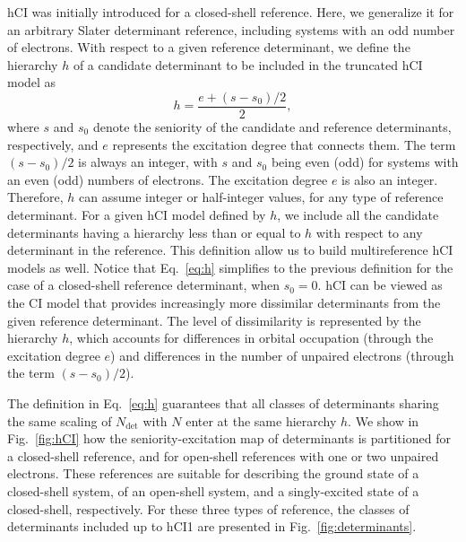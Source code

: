\documentclass[aip,jcp,reprint,noshowkeys,superscriptaddress]{revtex4-1}
\newcommand{\Ndet}{N_\text{det}}
\begin{document}
hCI was initially introduced for a closed-shell reference. \cite{Kossoski_2022}
Here, we generalize it for an arbitrary Slater determinant reference, including systems with an odd number of electrons.
With respect to a given reference determinant, we define the hierarchy $h$ of a candidate determinant to be included in the truncated hCI model as
\begin{equation}
  \label{eq:h}
  h = \frac{e+ (s-s_0)/2}{2},
\end{equation}
where $s$ and $s_0$ denote the seniority of the candidate and reference determinants, respectively, and $e$ represents the excitation degree that connects them.
The term $(s-s_0)/2$ is always an integer, with $s$ and $s_0$ being even (odd) for systems with an even (odd) numbers of electrons. The excitation degree $e$ is also an integer.
Therefore, $h$ can assume integer or half-integer values, for any type of reference determinant.
For a given hCI model defined by $h$, we include all the candidate determinants having a hierarchy less than or equal to $h$ with respect to any determinant in the reference.
This definition allow us to build multireference hCI models as well.
Notice that Eq.~\eqref{eq:h} simplifies to the previous definition \cite{Kossoski_2022} for the case of a closed-shell reference determinant, when $s_0 = 0$.
hCI can be viewed as the CI model that provides increasingly more dissimilar determinants from the given reference determinant.
The level of dissimilarity is represented by the hierarchy $h$, which accounts for differences in orbital occupation (through the excitation degree $e$)
and differences in the number of unpaired electrons (through the term $(s-s_0)/2$).

The definition in Eq.~\eqref{eq:h} guarantees that all classes of determinants sharing the same scaling of $\Ndet$ with $N$ enter at the same hierarchy $h$.
We show in Fig.~\ref{fig:hCI} how the seniority-excitation map of determinants is partitioned for a closed-shell reference, and for open-shell references with one or two unpaired electrons.
These references are suitable for describing the ground state of a closed-shell system, of an open-shell system, and a singly-excited state of a closed-shell, respectively.
For these three types of reference, the classes of determinants included up to hCI1 are presented in Fig.~\ref{fig:determinants}.
 
\end{document}

